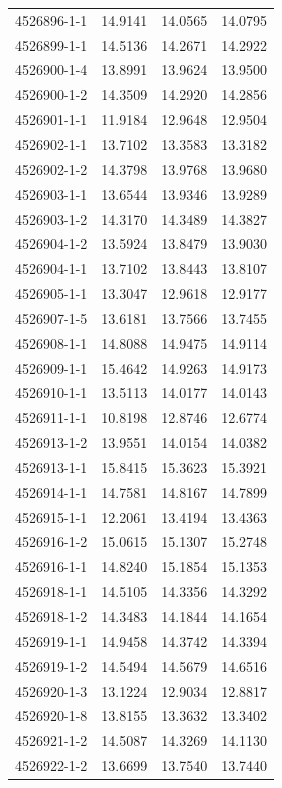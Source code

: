 \begin{longtable}{lrrr}
4526896-1-1 & 14.9141 & 14.0565 & 14.0795 \\
4526899-1-1 & 14.5136 & 14.2671 & 14.2922 \\
4526900-1-4 & 13.8991 & 13.9624 & 13.9500 \\
4526900-1-2 & 14.3509 & 14.2920 & 14.2856 \\
4526901-1-1 & 11.9184 & 12.9648 & 12.9504 \\
4526902-1-1 & 13.7102 & 13.3583 & 13.3182 \\
4526902-1-2 & 14.3798 & 13.9768 & 13.9680 \\
4526903-1-1 & 13.6544 & 13.9346 & 13.9289 \\
4526903-1-2 & 14.3170 & 14.3489 & 14.3827 \\
4526904-1-2 & 13.5924 & 13.8479 & 13.9030 \\
4526904-1-1 & 13.7102 & 13.8443 & 13.8107 \\
4526905-1-1 & 13.3047 & 12.9618 & 12.9177 \\
4526907-1-5 & 13.6181 & 13.7566 & 13.7455 \\
4526908-1-1 & 14.8088 & 14.9475 & 14.9114 \\
4526909-1-1 & 15.4642 & 14.9263 & 14.9173 \\
4526910-1-1 & 13.5113 & 14.0177 & 14.0143 \\
4526911-1-1 & 10.8198 & 12.8746 & 12.6774 \\
4526913-1-2 & 13.9551 & 14.0154 & 14.0382 \\
4526913-1-1 & 15.8415 & 15.3623 & 15.3921 \\
4526914-1-1 & 14.7581 & 14.8167 & 14.7899 \\
4526915-1-1 & 12.2061 & 13.4194 & 13.4363 \\
4526916-1-2 & 15.0615 & 15.1307 & 15.2748 \\
4526916-1-1 & 14.8240 & 15.1854 & 15.1353 \\
4526918-1-1 & 14.5105 & 14.3356 & 14.3292 \\
4526918-1-2 & 14.3483 & 14.1844 & 14.1654 \\
4526919-1-1 & 14.9458 & 14.3742 & 14.3394 \\
4526919-1-2 & 14.5494 & 14.5679 & 14.6516 \\
4526920-1-3 & 13.1224 & 12.9034 & 12.8817 \\
4526920-1-8 & 13.8155 & 13.3632 & 13.3402 \\
4526921-1-2 & 14.5087 & 14.3269 & 14.1130 \\
4526922-1-2 & 13.6699 & 13.7540 & 13.7440 \\

\end{longtable}
